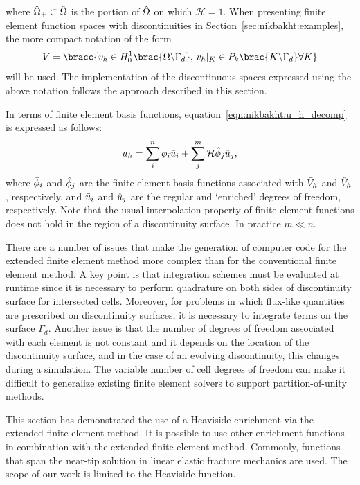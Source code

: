 %
where $\Hat{\Omega}_{+} \subset \Hat{\Omega}$ is the portion of
$\Hat{\Omega}$ on which $\mathcal{H} = 1$.
When presenting finite element function spaces
with discontinuities in Section~\ref{sec:nikbakht:examples}, the more compact
notation of the form
%
\begin{equation}
  V = \bracc{v_{h} \in H_{0}^{1}\brac{\Omega \backslash \Gamma_{d}}, \,
          v_{h}|_{K} \in P_{k}\brac{K \backslash \Gamma_{d}} \forall K}
\end{equation}
%
will be used. The implementation of the discontinuous spaces expressed
using the above notation follows the approach described in this section.

In terms of finite element basis functions,
equation~\eqref{eqn:nikbakht:u_h_decomp} is expressed as follows:
%
\begin{equation}
  u_{h} = \sum_{i}^{n} \Bar{\phi}_{i} \Bar{u}_{i}
    + \sum_{j}^{m} \mathcal{H} \Hat{\phi}_{j} \Hat{u}_{j},
\label{eqn:nikbakht:basis_decomp}
\end{equation}
%
where $\Bar{\phi}_{i}$ and $\Hat{\phi}_{j}$ are the finite element basis
functions associated with $\Bar{V}_{h}$ and $\Hat{V}_{h}$, respectively,
and $\Bar{u}_{i}$ and $\Hat{u}_{j}$ are the regular and `enriched' degrees
of freedom, respectively. Note that the usual interpolation property
of finite element functions does not hold in the region of a discontinuity
surface. In practice $m \ll n$.

There are a number of issues that make the generation of computer
code for the extended finite element method more complex than for the
conventional finite element method.  A key point is that integration
schemes must be evaluated at runtime since it is necessary to perform
quadrature on both sides of discontinuity surface for intersected cells.
Moreover, for problems in which flux-like quantities are prescribed
on discontinuity surfaces, it is necessary to integrate terms on the
surface $\Gamma_{d}$.  Another issue is that the number of degrees of
freedom associated with each element is not constant and it depends on
the location of the discontinuity surface, and in the case of an evolving
discontinuity, this changes during a simulation.  The variable number
of cell degrees of freedom can make it difficult to generalize existing
finite element solvers to support partition-of-unity methods.

This section has demonstrated the use of a Heaviside enrichment via the
extended finite element method. It is possible to use other enrichment
functions in combination with the extended finite element method.
Commonly, functions that span the near-tip solution in linear elastic
fracture mechanics are used.  The scope of our work is limited to the
Heaviside function.

